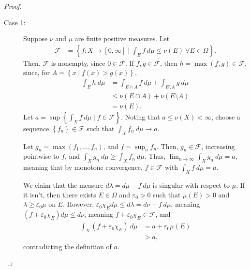 \documentclass[12pt]{extarticle}
\newcommand{\set}[1]{\left\{#1\right\}}
\newcommand{\ve}{\varepsilon}
\theoremstyle{plain}
\theoremstyle{definition}
\theoremstyle{note}
\renewcommand{\newline}{\hfill\break}
\begin{document}
\begin{proof}\hfill
  \begin{description}
    \item[Case 1:] Suppose $\nu$ and $\mu$ are finite positive measures. Let
      \begin{align*}
        \mathcal{F} &= \set{f: X\rightarrow[0,\infty]\mid \int_{E}^{} f\:d\mu \leq \nu(E)~\forall E\in \Omega}.
      \end{align*}
      Then, $\mathcal{F}$ is nonempty, since $0\in \mathcal{F}$. If $f,g\in \mathcal{F}$, then $h = \max\left(f,g\right) \in \mathcal{F}$, since, for $A = \set{x\mid f(x) > g(x)}$,
      \begin{align*}
        \int_{E}^{} h\:d\mu &= \int_{E\cap A}^{} f\:d\mu + \int_{E\setminus A}^{} g\:d\mu\\
                            &\leq \nu\left(E\cap A\right) + \nu\left(E\setminus A\right)\\
                            &= \nu\left(E\right).
      \end{align*}
      Let $a = \sup\set{\int_{X}^{} f\:d\mu\mid f\in \mathcal{F}}$. Noting that $a\leq \nu(X) < \infty$, choose a sequence $\set{f_n}\in \mathcal{F}$ such that $\int_{X}f_n\:d\mu \rightarrow a$.\newline

      Let $g_n = \max\left(f_1,\dots,f_n\right)$, and $f = \sup_{n}f_n$. Then, $g_n \in \mathcal{F}$, increasing pointwise to $f$, and $\int_{X}^{} g_n\:d\mu \geq \int_{X}^{} f_n\:d\mu$. Thus, $\lim_{n\rightarrow\infty}\int_{X}^{} g_n\:d\mu = a$, meaning that by monotone convergence, $f\in \mathcal{F}$ with $\int_{X}^{} f\:d\mu = a$.\newline

      We claim that the measure $d\lambda = d\mu - f\:d\mu$ is singular with respect to $\mu$. If it isn't, then there exists $E\in \Omega$ and $\ve_0 > 0$ such that $\mu\left(E\right) > 0$ and $\lambda \geq \ve_0 \mu$ on $E$. However, $\ve_0 \chi_{E}d\mu \leq d\lambda = d\nu - f\:d\mu$, meaning $\left(f + \ve_0\chi_{E}\right)d\mu \leq d\nu$, meaning $f + \ve_0\chi_E\in \mathcal{F}$, and
      \begin{align*}
        \int_{X}^{} \left(f + \ve_0 \chi_E\right)\:d\mu &= a + \ve_0\mu(E)\\
                                                        &> a,
      \end{align*}
      contradicting the definition of $a$.\newline


\end{description}
\end{proof}
\end{document}
